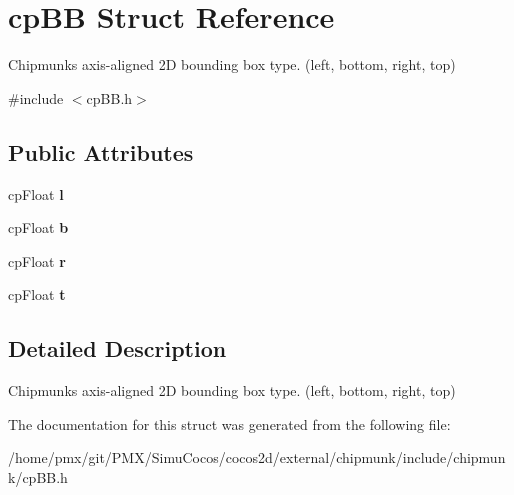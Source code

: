 \hypertarget{structcpBB}{}\section{cp\+BB Struct Reference}
\label{structcpBB}


Chipmunk\textquotesingle{}s axis-\/aligned 2D bounding box type. (left, bottom, right, top)  




{\ttfamily \#include $<$cp\+B\+B.\+h$>$}

\subsection*{Public Attributes}
\begin{DoxyCompactItemize}
\item 
\mbox{\label{structcpBB_a6f88af28bf75a4ddfd0115fbd24f27ab}} 
cp\+Float {\bfseries l}
\item 
\mbox{\label{structcpBB_a8bdd6bf0baf92571d31a1ab85e63a183}} 
cp\+Float {\bfseries b}
\item 
\mbox{\label{structcpBB_a552ee5c6597e79313bd5c85e7c6557af}} 
cp\+Float {\bfseries r}
\item 
\mbox{\label{structcpBB_aee66985512eb137134d15ee6ac343bcd}} 
cp\+Float {\bfseries t}
\end{DoxyCompactItemize}


\subsection{Detailed Description}
Chipmunk\textquotesingle{}s axis-\/aligned 2D bounding box type. (left, bottom, right, top) 

The documentation for this struct was generated from the following file\+:\begin{DoxyCompactItemize}
\item 
/home/pmx/git/\+P\+M\+X/\+Simu\+Cocos/cocos2d/external/chipmunk/include/chipmunk/cp\+B\+B.\+h\end{DoxyCompactItemize}
